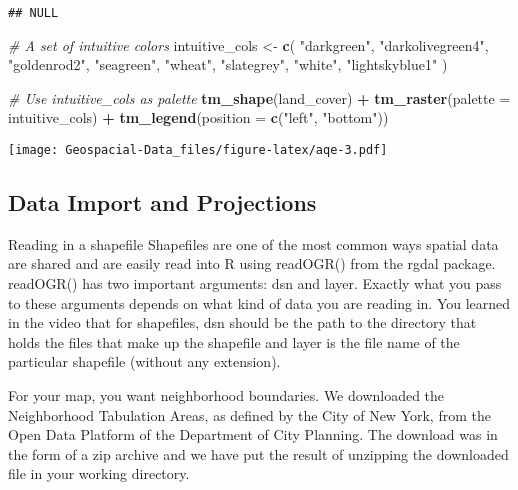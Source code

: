 \documentclass[]{article}
\newenvironment{Shaded}{\begin{snugshade}}{\end{snugshade}}
\newcommand{\CommentTok}[1]{\textcolor[rgb]{0.56,0.35,0.01}{\textit{#1}}}
\newcommand{\DataTypeTok}[1]{\textcolor[rgb]{0.13,0.29,0.53}{#1}}
\newcommand{\KeywordTok}[1]{\textcolor[rgb]{0.13,0.29,0.53}{\textbf{#1}}}
\newcommand{\NormalTok}[1]{#1}
\newcommand{\OperatorTok}[1]{\textcolor[rgb]{0.81,0.36,0.00}{\textbf{#1}}}
\newcommand{\StringTok}[1]{\textcolor[rgb]{0.31,0.60,0.02}{#1}}
\begin{document}
\begin{verbatim}
## NULL
\end{verbatim}

\begin{Shaded}
\begin{Highlighting}[]
\CommentTok{# A set of intuitive colors}
\NormalTok{intuitive_cols <-}\StringTok{ }\KeywordTok{c}\NormalTok{(}
  \StringTok{"darkgreen"}\NormalTok{,}
  \StringTok{"darkolivegreen4"}\NormalTok{,}
  \StringTok{"goldenrod2"}\NormalTok{,}
  \StringTok{"seagreen"}\NormalTok{,}
  \StringTok{"wheat"}\NormalTok{,}
  \StringTok{"slategrey"}\NormalTok{,}
  \StringTok{"white"}\NormalTok{,}
  \StringTok{"lightskyblue1"}
\NormalTok{)}

\CommentTok{# Use intuitive_cols as palette}
\KeywordTok{tm_shape}\NormalTok{(land_cover) }\OperatorTok{+}
\StringTok{  }\KeywordTok{tm_raster}\NormalTok{(}\DataTypeTok{palette =}\NormalTok{ intuitive_cols) }\OperatorTok{+}
\StringTok{  }\KeywordTok{tm_legend}\NormalTok{(}\DataTypeTok{position =} \KeywordTok{c}\NormalTok{(}\StringTok{"left"}\NormalTok{, }\StringTok{"bottom"}\NormalTok{))}
\end{Highlighting}
\end{Shaded}

\texttt{[image: Geospacial-Data\_files/figure-latex/aqe-3.pdf]}

\hypertarget{data-import-and-projections}{%
\subsection{Data Import and
Projections}\label{data-import-and-projections}}

Reading in a shapefile Shapefiles are one of the most common ways
spatial data are shared and are easily read into R using readOGR() from
the rgdal package. readOGR() has two important arguments: dsn and layer.
Exactly what you pass to these arguments depends on what kind of data
you are reading in. You learned in the video that for shapefiles, dsn
should be the path to the directory that holds the files that make up
the shapefile and layer is the file name of the particular shapefile
(without any extension).

For your map, you want neighborhood boundaries. We downloaded the
Neighborhood Tabulation Areas, as defined by the City of New York, from
the Open Data Platform of the Department of City Planning. The download
was in the form of a zip archive and we have put the result of unzipping
the downloaded file in your working directory.
\end{document}
